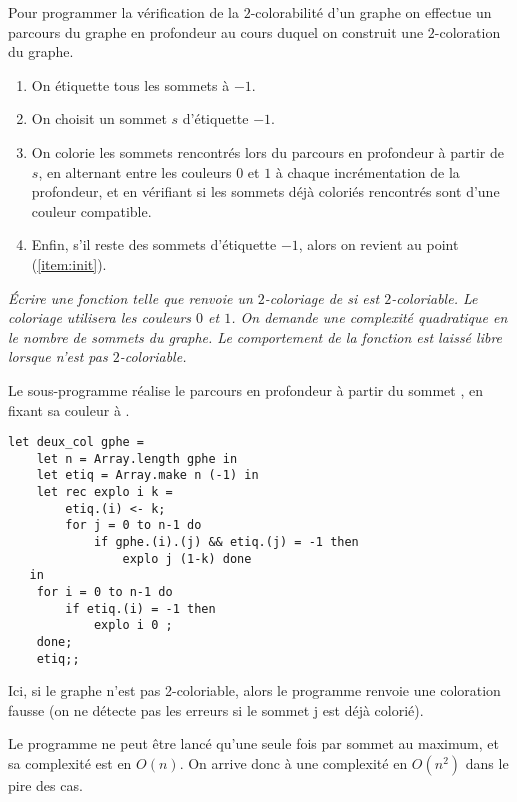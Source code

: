 Pour programmer la vérification de la $2$-colorabilité d'un graphe on effectue un parcours du graphe en profondeur au cours duquel on construit une $2$-coloration du graphe.
\begin{enumerate}
    \item On étiquette tous les sommets à $-1$.
    \item \label{item:init}On choisit un sommet $s$ d'étiquette $-1$.
    \item On colorie les sommets rencontrés lors du parcours en profondeur à partir de $s$, en alternant entre les couleurs $0$ et $1$ à chaque incrémentation de la profondeur, et en vérifiant si les sommets déjà coloriés rencontrés sont d'une couleur compatible. 
    \item Enfin, s'il reste des sommets d'étiquette $-1$, alors on revient au point (\ref{item:init}). 
\end{enumerate}
\newpage
\begin{Exercise}\it 
Écrire une fonction  telle que  renvoie un $2$-coloriage de  si  est $2$-coloriable. Le coloriage utilisera les couleurs $0$ et $1$. On demande une complexité quadratique en le nombre de sommets du graphe. Le comportement de la fonction est laissé libre lorsque  n'est pas $2$-coloriable. 
\end{Exercise} 
\begin{Answer}
Le sous-programme  réalise le parcours en profondeur à partir du sommet , en fixant sa couleur à .

\begin{lstlisting}
let deux_col gphe = 
    let n = Array.length gphe in
    let etiq = Array.make n (-1) in
    let rec explo i k = 
        etiq.(i) <- k;
        for j = 0 to n-1 do
            if gphe.(i).(j) && etiq.(j) = -1 then
                explo j (1-k) done
   in
    for i = 0 to n-1 do
        if etiq.(i) = -1 then 
            explo i 0 ;
    done;
    etiq;; 
\end{lstlisting}

Ici, si le graphe n'est pas 2-coloriable, alors le programme renvoie une coloration fausse (on ne détecte pas les erreurs si le sommet j est déjà colorié). 

Le programme  ne peut être lancé qu'une seule fois par sommet au maximum, et sa complexité est en $O(n)$. On arrive donc à une complexité en $O(n^2)$ dans le pire des cas. 
\end{Answer}
